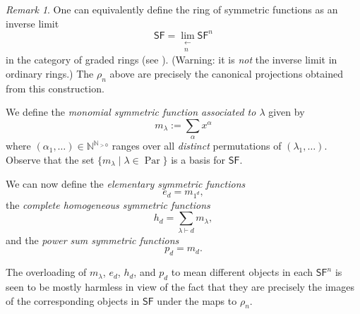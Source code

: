\documentclass[12pt]{article}
\theoremstyle{plain}
\theoremstyle{definition}
\theoremstyle{remark}
\newtheorem{remark}[theorem]{Remark}
\numberwithin{equation}{section}
\begin{document}
\begin{remark}
One can equivalently define the ring of symmetric functions as an inverse
limit
\[
\mathsf{SF} = \lim_{\substack{\longleftarrow\\n}} \mathsf{SF}^n
\]
in the category of graded rings (see \cite{Macdonald}).
(Warning: it is \emph{not} the inverse limit in ordinary rings.)
The $\rho_n$ above are precisely the canonical projections obtained from
this construction.
\end{remark}

We define the \emph{monomial symmetric function associated to $\lambda$}
given by
\[
m_\lambda := \sum_{\alpha} x^\alpha
\]
where $(\alpha_1,\ldots) \in \mathbb{N}^{\mathbb{N}_{>0}}$ ranges over all
\emph{distinct} permutations of $(\lambda_1,\ldots)$.
Observe that the set $\{ m_\lambda \mid \lambda \in
\operatorname{Par}\}$ is a basis for $\mathsf{SF}$.

We can now define the \emph{elementary symmetric functions}
\[
e_d = m_{1^d},
\]
the \emph{complete homogeneous symmetric functions}
\[
h_d = \sum_{\lambda \vdash d} m_\lambda ,
\]
and the \emph{power sum symmetric functions}
\[
p_d = m_{d}.
\]

The overloading of $m_\lambda$, $e_d$, $h_d$, and $p_d$ to mean
different objects in each $\mathsf{SF}^n$ is seen to be mostly harmless
in view of the fact that they are precisely the images of the
corresponding objects in $\mathsf{SF}$ under the maps to $\rho_n$.



\end{document}
